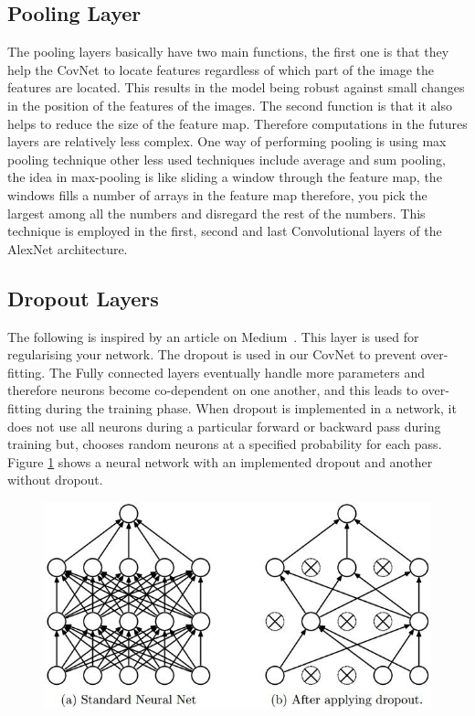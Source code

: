 \documentclass[12pt, a4paper,oneside]{report}
\begin{document}
\subsection{Pooling Layer}
The pooling layers basically have two main functions, the first one is that they help the CovNet to locate features regardless of which part of the image the features are located. This results in the model being robust against small changes in the position of the features of the images. The second function is that it also helps to reduce the size of the feature map. Therefore computations in the futures layers are relatively less complex. One way of performing pooling is using max pooling technique other less used techniques include average and sum pooling, the idea in max-pooling is like sliding a window through the feature map, the windows fills a number of arrays in the feature map therefore, you pick the largest among all the numbers and disregard the rest of the numbers. This technique is employed in the first, second and last Convolutional layers of the AlexNet architecture.

\subsection{Dropout Layers}
The following is inspired by an article on Medium~\cite{dropout}. This layer is used for regularising your network. The dropout is used in our CovNet to prevent over-fitting. The Fully connected layers eventually handle more parameters and therefore neurons become co-dependent on one another, and this leads to over-fitting during the training phase. When dropout is implemented in a network, it does not use all neurons during a particular forward or backward pass during training but, chooses random neurons at a specified probability for each pass. Figure \ref{fig:dropout} shows a neural network with an implemented dropout and another without dropout.

\begin{figure}[!htb]
	\includegraphics [scale=0.6] {dropout}
	\label{fig:dropout}
\end{figure}
\end{document}
